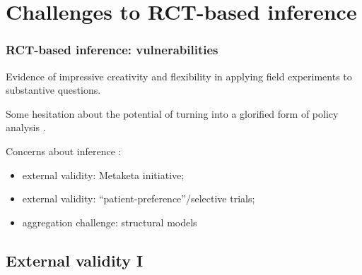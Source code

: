 \documentclass[12pt,english,dvipsnames,aspectratio=169,handout]{beamer}\usepackage[]{graphicx}\usepackage[]{xcolor}
\begin{document}
\section{Challenges to RCT-based inference}

\begin{frame}
  \frametitle{RCT-based inference: vulnerabilities}
  Evidence of impressive creativity and flexibility in applying field experiments to substantive questions.\bigskip
  \pause
  
  Some hesitation about the potential of turning into a glorified form of policy analysis \cite{bates_banerjees_2006}.\bigskip
  \pause
  
  Concerns about inference \cite{humphreys_aggregation_2020}:
  
  \begin{itemize}
    \item external validity: Metaketa initiative;
    \item external validity: ``patient-preference''/selective trials;
    \item aggregation challenge: structural models
  \end{itemize}
  
\end{frame}


\subsection{External validity I}
\end{document}
